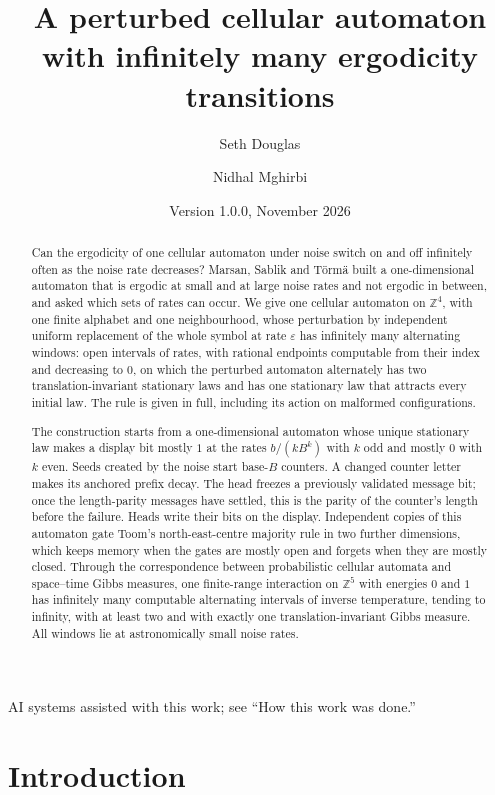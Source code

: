 \documentclass[11pt]{article}
\title{\vspace{-1.2cm}\LARGE A perturbed cellular automaton\\ with infinitely many ergodicity transitions}
\author{Seth Douglas \and Nidhal Mghirbi}
\date{\small Version 1.0.0, November 2026}
\theoremstyle{plain}
\theoremstyle{definition}
\theoremstyle{remark}
\newcommand{\Z}{\mathbb Z}
\newcommand{\eps}{\varepsilon}
\begin{document}
\maketitle
\begin{abstract}
\noindent
Can the ergodicity of one cellular automaton under noise switch on and off infinitely often as the noise rate decreases? Marsan, Sablik and T\"orm\"a built a one-dimensional automaton that is ergodic at small and at large noise rates and not ergodic in between, and asked which sets of rates can occur. We give one cellular automaton on $\Z^4$, with one finite alphabet and one neighbourhood, whose perturbation by independent uniform replacement of the whole symbol at rate $\eps$ has infinitely many alternating windows: open intervals of rates, with rational endpoints computable from their index and decreasing to $0$, on which the perturbed automaton alternately has two translation-invariant stationary laws and has one stationary law that attracts every initial law. The rule is given in full, including its action on malformed configurations.

The construction starts from a one-dimensional automaton whose unique stationary law makes a display bit mostly $1$ at the rates $b/(kB^k)$ with $k$ odd and mostly $0$ with $k$ even. Seeds created by the noise start base-$B$ counters. A changed counter letter makes its anchored prefix decay. The head freezes a previously validated message bit; once the length-parity messages have settled, this is the parity of the counter's length before the failure. Heads write their bits on the display. Independent copies of this automaton gate Toom's north-east-centre majority rule in two further dimensions, which keeps memory when the gates are mostly open and forgets when they are mostly closed. Through the correspondence between probabilistic cellular automata and space--time Gibbs measures, one finite-range interaction on $\Z^5$ with energies $0$ and $1$ has infinitely many computable alternating intervals of inverse temperature, tending to infinity, with at least two and with exactly one translation-invariant Gibbs measure. All windows lie at astronomically small noise rates.
\end{abstract}
\begin{center}\small AI systems assisted with this work; see ``How this work was done.''\end{center}
{\small\tableofcontents}

\section{Introduction}\label{sec:intro}
\end{document}
